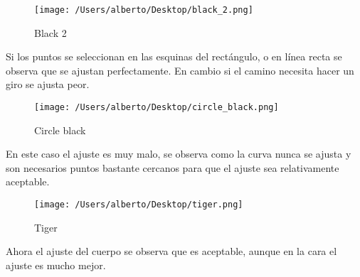 \begin{figure}[H] %
\centering
\texttt{[image: /Users/alberto/Desktop/black\_2.png]}  %
\label{kk1}
\caption{Black 2} 
\end{figure}

Si los puntos se seleccionan en las esquinas del rectángulo, o en línea recta se observa que se ajustan perfectamente. En cambio si el camino necesita hacer un giro se ajusta peor.

\begin{figure}[H] %
\centering
\texttt{[image: /Users/alberto/Desktop/circle\_black.png]}  %
\label{kk1}
\caption{Circle black} 
\end{figure}

En este caso el ajuste es muy malo, se observa como la curva nunca se ajusta y son necesarios puntos bastante cercanos para que el ajuste sea relativamente aceptable.

\begin{figure}[H] %
\centering
\texttt{[image: /Users/alberto/Desktop/tiger.png]}  %
\label{kk1}
\caption{Tiger} 
\end{figure}

Ahora el ajuste del cuerpo se observa que es aceptable, aunque en la cara el ajuste es mucho mejor.





